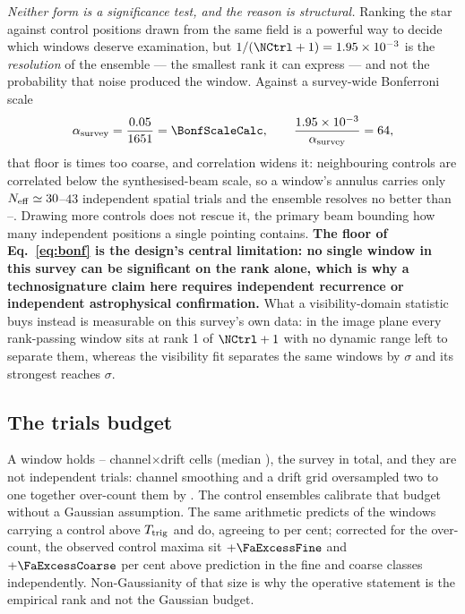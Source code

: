 \emph{Neither form is a significance test, and the reason is structural.}
Ranking the star against \NCtrl{} control positions drawn from the same field
is a powerful way to decide which windows deserve examination, but
$1/(\NCtrl+1)=\RankFloorVal$ is the \emph{resolution} of the ensemble --- the
smallest rank it can express --- and not the probability that noise produced
the window. Against a survey-wide Bonferroni scale
%
\begin{equation}
\alpha_{\rm survey}=\frac{0.05}{\NWindows}=\BonfScaleCalc,
\qquad
\frac{\RankFloorVal}{\alpha_{\rm survey}}=\BonfRankRatio,
\label{eq:bonf}
\end{equation}
%
that floor is \BonfRankRatio{} times too coarse, and correlation widens it:
neighbouring controls are correlated below the synthesised-beam scale, so a
window's annulus carries only $N_{\rm eff}\simeq30$--$43$ independent spatial
trials and the ensemble resolves no better than \RankEffLo--\RankEffHi.
Drawing more controls does not rescue it, the primary beam bounding how many
independent positions a single pointing contains. \textbf{The floor of
Eq.~\ref{eq:bonf} is the design's central limitation: no single window in this survey can be
significant on the rank alone, which is why a technosignature claim here
requires independent recurrence or independent astrophysical confirmation.}
What a visibility-domain statistic buys instead is measurable on this survey's
own data: in the image plane every rank-passing window sits at rank 1 of
$\NCtrl+1$ with no dynamic range left to separate them, whereas the
visibility fit separates the same windows by \VgSep$\sigma$ and its strongest
reaches \VgVisMax$\sigma$.

\subsection{The trials budget}

A window holds \CellsWinMin--\CellsWinMax{} channel$\times$drift cells
(median \CellsWinMed), the survey \CellsTotal{} in total, and they are not
independent trials: channel smoothing and a drift grid oversampled two to
one together over-count them by \FaOverCount. The control ensembles
calibrate that budget without a Gaussian assumption. The same arithmetic
predicts \NCtrlWinExp{} of the \NWindows{} windows carrying a control above
$T_{\rm trig}$ and \NCtrlWinObs{} do, agreeing to \CtrlWinAgreePct{} per
cent; corrected for the over-count, the observed control maxima sit
$+\FaExcessFine$ and $+\FaExcessCoarse$ per cent above prediction in the
fine and coarse classes independently. Non-Gaussianity of that size is why
the operative statement is the empirical rank and not the Gaussian
budget.

